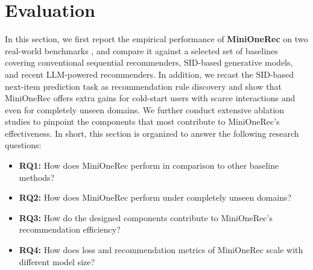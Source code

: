 \section{Evaluation}

In this section, we first report the empirical performance of \textbf{MiniOneRec} on two real-world benchmarks \citep{amazon}, and compare it against a selected set of baselines covering conventional sequential recommenders, SID-based generative models, and recent LLM-powered recommenders.
In addition, we recast the SID-based next-item prediction task as
recommendation rule discovery and show that MiniOneRec offers extra gains
for cold-start users with scarce interactions and even for completely unseen domains.
We further conduct extensive ablation studies to pinpoint the components that most contribute to MiniOneRec’s effectiveness. 
In short, this section is organized to answer the following research 
questions:
\begin{itemize}[leftmargin=*]
    \item \textbf{RQ1:} How does MiniOneRec perform in comparison to other baseline methods?
    
    \item \textbf{RQ2:} How does MiniOneRec perform under completely unseen domains?
    
    \item \textbf{RQ3:} How do the designed components contribute to MiniOneRec's recommendation efficiency?
    \item \textbf{RQ4:} How does loss and recommendation metrics of MiniOneRec scale with different model size?
\end{itemize}

